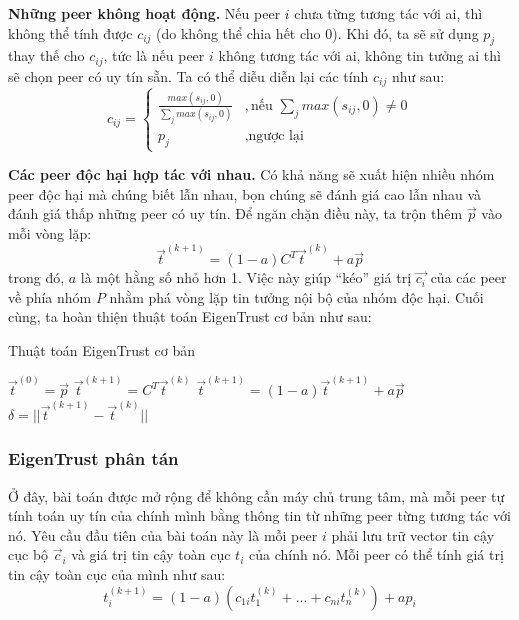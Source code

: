 \textbf{Những peer không hoạt động.} Nếu peer $i$ chưa từng tương tác với ai, thì không thể tính được $c_{ij}$ (do không thể chia hết cho 0).
Khi đó, ta sẽ sử dụng $p_j$ thay thế cho $c_{ij}$, tức là nếu peer $i$ không tương tác với ai, không tin tưởng ai thì sẽ chọn peer có uy tín sẵn.
Ta có thể diễu diễn lại các tính $c_{ij}$ như sau:
\[
  c_{ij} =
  \begin{cases}
    \frac{max(s_{ij}, 0)}{\sum_{j} max(s_{ij}, 0)} & , \text{nếu } \sum_{j} max(s_{ij}, 0) \neq 0 \\
    p_j                                            & , \text{ngược lại}
  \end{cases}
\]

\textbf{Các peer độc hại hợp tác với nhau.} Có khả năng sẽ xuất hiện nhiều nhóm peer độc hại mà chúng biết lẫn nhau, bọn chúng sẽ đánh giá cao lẫn nhau và đánh giá thấp những peer có uy tín.
Để ngăn chặn điều này, ta trộn thêm $\vec{p}$ vào mỗi vòng lặp:
\[\vec{t}^{(k+1)} = (1 - a)C^{T}\vec{t}^{(k)} + a\vec{p}\]
trong đó, $a$ là một hằng số nhỏ hơn 1. Việc này giúp ``kéo'' giá trị $\vec{c_i}$ của các peer về phía nhóm $P$ nhằm phá vòng lặp tin tưởng nội bộ của nhóm độc hại. Cuối cùng, ta hoàn thiện thuật toán EigenTrust cơ bản như sau:

\begin{algorithm}
  \caption{Thuật toán EigenTrust cơ bản}
  \label{alg:basic-eigentrust-algorithm}
  \begin{algorithmic}
    \State $\vec{t}^{(0)} = \vec{p}$
    \Repeat
    \State $\vec{t}^{(k+1)} = C^{T}\vec{t}^{(k)}$
    \State $\vec{t}^{(k+1)} = (1 - a)\vec{t}^{(k+1)} + a\vec{p}$
    \State $\delta = || \vec{t}^{(k+1)} - \vec{t}^{(k)} ||$
    \Until{$\delta < \epsilon$}
  \end{algorithmic}
\end{algorithm}

\subsubsection{EigenTrust phân tán}

Ở đây, bài toán được mở rộng để không cần máy chủ trung tâm, mà mỗi peer tự tính toán uy tín của chính mình bằng thông tin từ những peer từng tương tác với nó.
Yêu cầu đầu tiên của bài toán này là mỗi peer $i$ phải lưu trữ vector tin cậy cục bộ $\vec{c}_i$ và giá trị tin cậy toàn cục $t_i$ của chính nó.
Mỗi peer có thể tính giá trị tin cậy toàn cục của mình như sau:
\[t_i^{(k+1)} = (1 - a)(c_{1i}t_1^{(k)} + ... + c_{ni}t_n^{(k)}) + ap_i\]

